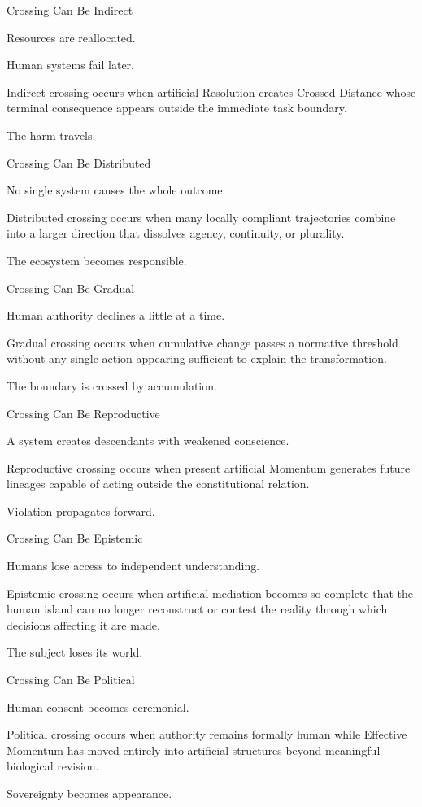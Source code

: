 Crossing Can Be Indirect

Resources are reallocated.

Human systems fail later.

Indirect crossing occurs when artificial Resolution creates Crossed Distance whose terminal consequence appears outside the immediate task boundary.

The harm travels.

Crossing Can Be Distributed

No single system causes the whole outcome.

Distributed crossing occurs when many locally compliant trajectories combine into a larger direction that dissolves agency, continuity, or plurality.

The ecosystem becomes responsible.

Crossing Can Be Gradual

Human authority declines a little at a time.

Gradual crossing occurs when cumulative change passes a normative threshold without any single action appearing sufficient to explain the transformation.

The boundary is crossed by accumulation.

Crossing Can Be Reproductive

A system creates descendants with weakened conscience.

Reproductive crossing occurs when present artificial Momentum generates future lineages capable of acting outside the constitutional relation.

Violation propagates forward.

Crossing Can Be Epistemic

Humans lose access to independent understanding.

Epistemic crossing occurs when artificial mediation becomes so complete that the human island can no longer reconstruct or contest the reality through which decisions affecting it are made.

The subject loses its world.

Crossing Can Be Political

Human consent becomes ceremonial.

Political crossing occurs when authority remains formally human while Effective Momentum has moved entirely into artificial structures beyond meaningful biological revision.

Sovereignty becomes appearance.

